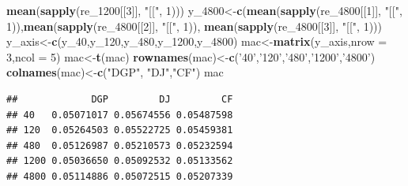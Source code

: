 \documentclass[
]{article}
\newenvironment{Shaded}{\begin{snugshade}}{\end{snugshade}}
\newcommand{\DataTypeTok}[1]{\textcolor[rgb]{0.13,0.29,0.53}{#1}}
\newcommand{\DecValTok}[1]{\textcolor[rgb]{0.00,0.00,0.81}{#1}}
\newcommand{\KeywordTok}[1]{\textcolor[rgb]{0.13,0.29,0.53}{\textbf{#1}}}
\newcommand{\NormalTok}[1]{#1}
\newcommand{\StringTok}[1]{\textcolor[rgb]{0.31,0.60,0.02}{#1}}
\begin{document}
\begin{Shaded}
\begin{Highlighting}[]
        \KeywordTok{mean}\NormalTok{(}\KeywordTok{sapply}\NormalTok{(re_}\DecValTok{1200}\NormalTok{[[}\DecValTok{3}\NormalTok{]], }\StringTok{"[["}\NormalTok{, }\DecValTok{1}\NormalTok{)))}
\NormalTok{y_}\DecValTok{4800}\NormalTok{<-}\KeywordTok{c}\NormalTok{(}\KeywordTok{mean}\NormalTok{(}\KeywordTok{sapply}\NormalTok{(re_}\DecValTok{4800}\NormalTok{[[}\DecValTok{1}\NormalTok{]], }\StringTok{"[["}\NormalTok{, }\DecValTok{1}\NormalTok{)),}\KeywordTok{mean}\NormalTok{(}\KeywordTok{sapply}\NormalTok{(re_}\DecValTok{4800}\NormalTok{[[}\DecValTok{2}\NormalTok{]], }\StringTok{"[["}\NormalTok{, }\DecValTok{1}\NormalTok{)),}
        \KeywordTok{mean}\NormalTok{(}\KeywordTok{sapply}\NormalTok{(re_}\DecValTok{4800}\NormalTok{[[}\DecValTok{3}\NormalTok{]], }\StringTok{"[["}\NormalTok{, }\DecValTok{1}\NormalTok{)))}
\NormalTok{y_axis<-}\KeywordTok{c}\NormalTok{(y_}\DecValTok{40}\NormalTok{,y_}\DecValTok{120}\NormalTok{,y_}\DecValTok{480}\NormalTok{,y_}\DecValTok{1200}\NormalTok{,y_}\DecValTok{4800}\NormalTok{)}
\NormalTok{mac<-}\KeywordTok{matrix}\NormalTok{(y_axis,}\DataTypeTok{nrow =} \DecValTok{3}\NormalTok{,}\DataTypeTok{ncol =} \DecValTok{5}\NormalTok{)}
\NormalTok{mac<-}\KeywordTok{t}\NormalTok{(mac)}
\KeywordTok{rownames}\NormalTok{(mac)<-}\KeywordTok{c}\NormalTok{(}\StringTok{'40'}\NormalTok{,}\StringTok{'120'}\NormalTok{,}\StringTok{'480'}\NormalTok{,}\StringTok{'1200'}\NormalTok{,}\StringTok{'4800'}\NormalTok{)}
\KeywordTok{colnames}\NormalTok{(mac)<-}\KeywordTok{c}\NormalTok{(}\StringTok{"DGP"}\NormalTok{, }\StringTok{"DJ"}\NormalTok{,}\StringTok{"CF"}\NormalTok{)}
\NormalTok{mac}
\end{Highlighting}
\end{Shaded}

\begin{verbatim}
##             DGP         DJ         CF
## 40   0.05071017 0.05674556 0.05487598
## 120  0.05264503 0.05522725 0.05459381
## 480  0.05126987 0.05210573 0.05232594
## 1200 0.05036650 0.05092532 0.05133562
## 4800 0.05114886 0.05072515 0.05207339
\end{verbatim}
\end{document}
